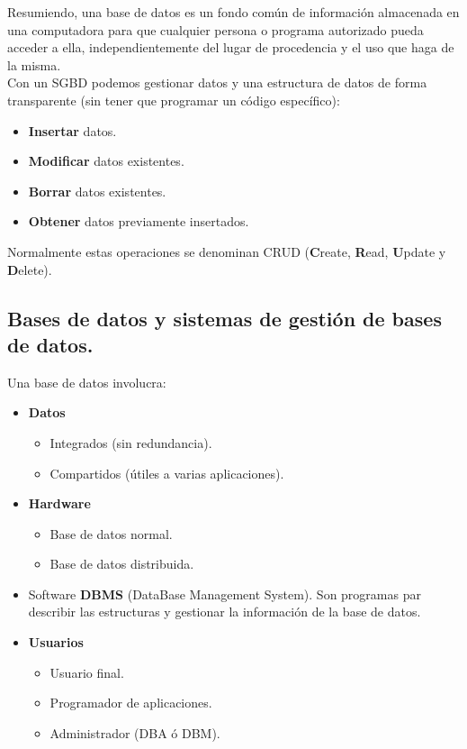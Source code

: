 \documentclass[12pt,spanish]{article}
\numberwithin{definition}{subsection}
\begin{document}
Resumiendo, una base de datos es un fondo común de información almacenada en una computadora para que cualquier persona o programa autorizado pueda acceder a ella, independientemente del lugar de procedencia  y el uso que haga de la misma.\\

Con un SGBD podemos gestionar datos y una estructura de datos de forma transparente (sin tener que programar un código específico):
	\begin{itemize}
		\item \textbf{Insertar} datos.
		\item \textbf{Modificar} datos existentes.
		\item \textbf{Borrar} datos existentes.
		\item \textbf{Obtener} datos previamente insertados.
	\end{itemize}
Normalmente estas operaciones se denominan CRUD (\textbf{C}reate, \textbf{R}ead, \textbf{U}pdate y \textbf{D}elete).


\subsection{Bases de datos y sistemas de gestión de bases de datos.}

Una base de datos involucra:

\begin{itemize}
	\item \textbf{Datos}
		\begin{itemize}
			\item Integrados (sin redundancia).
			\item Compartidos (útiles a varias aplicaciones).
		\end{itemize}
		\item \textbf{Hardware}
			\begin{itemize}
				\item Base de datos normal.
				\item Base de datos distribuida.
			\end{itemize}
		\item Software \textbf{DBMS} (DataBase Management System). Son programas par describir las estructuras y gestionar la información de la base de datos.
		\item \textbf{Usuarios}
			\begin{itemize}
				\item Usuario final.
				\item Programador de aplicaciones.
				\item Administrador (DBA ó DBM).
			\end{itemize}
\end{itemize}
\end{document}
